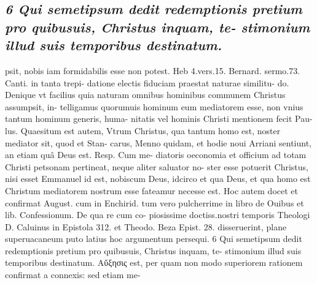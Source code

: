 \documentclass{article}
\begin{document}
\begin{pages}
\subsection*{\textit{6 Qui semetipsum dedit redemptionis pretium pro quibusuis, Christus inquam, te- stimonium illud suis temporibus destinatum.}}psit, nobis iam formidabilis esse non potest. Heb 4.vers.15. Bernard. sermo.73. Canti. in tanta trepi- datione electis fiduciam praestat naturae similitu- do. Denique vt facilius quia naturam omnibus hominibus communem Christus assumpsit, in- telligamus quorumuis hominum eum mediatorem esse, non vnius tantum hominum generis, huma- nitatis vel hominis Christi mentionem fecit Pau- lus. Quaesitum est autem, Vtrum Christus, qua tantum homo est, noster mediator sit, quod et Stan- carus, Menno quidam, et hodie noui Arriani sentiunt, an etiam quâ Deus est. Resp. Cum me- diatoris oeconomia et officium ad totam Christi petsonam pertineat, neque aliter saluator no- ster esse potuerit Christus, nisi esset Emmanuel id est, nobiscum Deus, idcirco et qua Deus, et qua homo est Christum mediatorem nostrum esse fateamur necesse est. Hoc autem docet et confirmat August. cum in Enchirid. tum vero pulcherrime in libro de Ouibus  et lib.  Confessionum. De qua re cum co- piosissime doctiss.nostri temporis Theologi D. Caluinus in Epistola 312. et Theodo. Beza Epist. 28. disseruerint, plane superuacaneum puto latius hoc argumentum persequi. 6 Qui semetipsum dedit redemptionis pretium pro quibusuis, Christus inquam, te- stimonium illud suis temporibus destinatum. Αὔξησις est, per quam non modo superiorem rationem confirmat a connexis: sed etiam me-  \pend

\end{pages}
\end{document}
